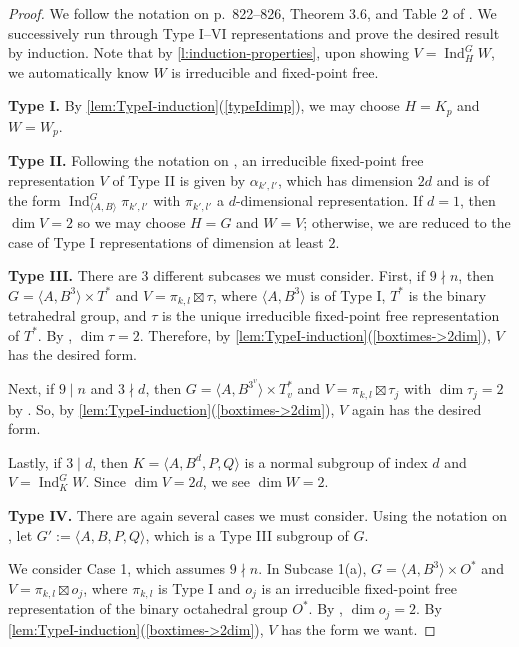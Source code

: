 \documentclass{amsart}
\theoremstyle{definition}
\DeclareMathOperator{\Ind}{Ind}
\begin{document}
\begin{proof}
We follow the notation on p.~822--826, Theorem 3.6, and Table 2 of \cite{Stepanov}. We successively run through Type I--VI representations and prove the desired result by induction. Note that by \autoref{l:induction-properties}, upon showing $V=\Ind_H^GW$, we automatically know $W$ is irreducible and fixed-point free.

\vspace{1em}
\noindent\textbf{Type I.} By \autoref{lem:TypeI-induction}(\ref{typeIdimp}), we may choose $H=K_p$ and $W=W_p$.

\vspace{1em}
\noindent\textbf{Type II.}
Following the notation on \cite[p.~822]{Stepanov}, an irreducible fixed-point free representation $V$ of Type II is given by $\alpha_{k',l'}$, which has dimension $2d$ and is of the form $\Ind_{\langle A,B\rangle}^G\pi_{k',l'}$ with $\pi_{k',l'}$ a $d$-dimensional representation. If $d=1$, then $\dim V=2$ so we may choose $H=G$ and $W=V$; otherwise, we are reduced to the case of Type I representations of dimension at least $2$.

\vspace{1em}
\noindent\textbf{Type III.}
There are 3 different subcases we must consider. First, if $9\nmid n$, then $G=\langle A,B^3\rangle\times T^*$ and $V=\pi_{k,l}\boxtimes\tau$, where $\langle A,B^3\rangle$ is of Type I, $T^*$ is the binary tetrahedral group, and $\tau$ is the unique irreducible fixed-point free representation of $T^*$. By \cite[Lemma~2.15]{Stepanov}, $\dim\tau=2$. Therefore, by \autoref{lem:TypeI-induction}(\ref{boxtimes->2dim}), $V$ has the desired form.

Next, if $9\mid n$ and $3\nmid d$, then $G=\langle A,B^{3^v}\rangle\times T_v^*$ and $V=\pi_{k,l}\boxtimes\tau_j$ with $\dim\tau_j=2$ by \cite[Lemma~2.15]{Stepanov}. So, by \autoref{lem:TypeI-induction}(\ref{boxtimes->2dim}), $V$ again has the desired form.

Lastly, if $3\mid d$, then $K=\langle A,B^d,P,Q\rangle$ is a normal subgroup of index $d$ and $V=\Ind_K^G W$. Since $\dim V=2d$, we see $\dim W=2$.

\vspace{1em}
\noindent
\textbf{Type IV.} 
There are again several cases we must consider. Using the notation on \cite[p.~823]{Stepanov}, let $G':=\langle A,B,P,Q\rangle$, which is a Type III subgroup of $G$. 

We consider Case 1, which assumes $9\nmid n$. In Subcase 1(a), $G=\langle A,B^3\rangle\times O^*$ and $V=\pi_{k,l}\boxtimes o_j$, where $\pi_{k,l}$ is Type I and $o_j$ is an irreducible fixed-point free representation of the binary octahedral group $O^*$. By \cite[Lemma~2.16]{Stepanov}, $\dim o_j=2$. By \autoref{lem:TypeI-induction}(\ref{boxtimes->2dim}), $V$ has the form we want.


\end{proof}
\end{document}
